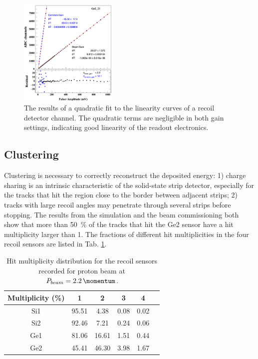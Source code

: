 \documentclass[number,5p]{elsarticle}
\begin{document}
\begin{figure}[htb!]
  \centering
  \includegraphics[width=0.42\textwidth]{./linearity_quadratic_residual.png}
  \caption{The results of a quadratic fit to the linearity curves of a recoil
    detector channel. The quadratic terms are negligible in both gain
    settings, indicating good linearity of the readout electronics.}
  \label{fig:electronic_linearity}
\end{figure}

\subsection{Clustering}
\label{sec:clustering}

Clustering is necessary to correctly reconstruct the deposited energy:
1) charge sharing is an intrinsic characteristic of the solid-state strip
detector, especially for the tracks that hit the region close to the border between adjacent strips; 2) tracks with
large recoil angles may penetrate through several strips before stopping.
The results from the simulation and the beam commissioning both show that more
than \SI{50}{\percent} of the tracks that hit the Ge2 sensor have a hit multiplicity
larger than 1. The fractions of different hit multiplicities in the four
recoil sensors are listed in Tab. \ref{tab:multiplicity}.
\begin{table}[htbp]
  \centering
  \caption{Hit multiplicity distribution for the recoil sensors recorded for
    proton beam at $P_{beam} = \SI{2.2}{\momentum}$.}
  \label{tab:multiplicity}
  \begin{tabular}{cccccc}
    \hline
    Multiplicity (\si{\percent}) & 1& 2& 3&  4 \\
    \hline
    Si1 & 95.51 & 4.38 & 0.08 & 0.02 \\
    Si2 & 92.46 & 7.21 & 0.24 & 0.06 \\
    Ge1 & 81.06 & 16.61 & 1.51  & 0.44 \\
    Ge2 & 45.41 & 46.30 & 3.98  & 1.67 \\
    \hline
  \end{tabular}
\end{table}
\end{document}
